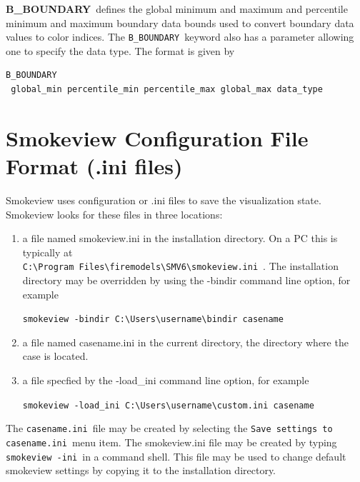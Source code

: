 \documentclass[11pt,twoside]{book}
\begin{document}
{\bf B\_BOUNDARY}\ defines the global minimum and maximum and percentile minimum and
maximum boundary
data bounds used to convert boundary data values to color indices.
The {\tt B\_BOUNDARY}\ keyword also has a parameter allowing
one to specify the data type.  The format is given by
\begin{lstlisting}
B_BOUNDARY
 global_min percentile_min percentile_max global_max data_type
\end{lstlisting}

\section{Smokeview Configuration File Format (.ini files)}
\label{sectionconfig}
\label{appendixini}

Smokeview uses configuration or .ini files to save the visualization state.
Smokeview looks for these files in three locations:
\begin{enumerate}
\item a file named smokeview.ini in the installation directory.  On a PC this is typically at\\
{\tt C:\textbackslash Program~Files\textbackslash firemodels\textbackslash SMV6\textbackslash smokeview.ini}~.
The installation directory may be
overridden by using the -bindir command line option, for example

{\tt smokeview -bindir C:\textbackslash Users\textbackslash username\textbackslash bindir casename}

\item a file named casename.ini in the current directory, the directory where the case is located.

\item a file specfied by the -load\_ini command line option, for example

{\tt smokeview -load\_ini C:\textbackslash Users\textbackslash username\textbackslash custom.ini casename}
\end{enumerate}

The {\tt casename.ini}\ file may be created by selecting the {\tt Save settings to casename.ini}\ menu item.
The smokeview.ini file may be created by typing {\tt smokeview -ini}\ in a command shell.
This file may be used to change default smokeview settings by copying it
to the installation directory.
\end{document}
